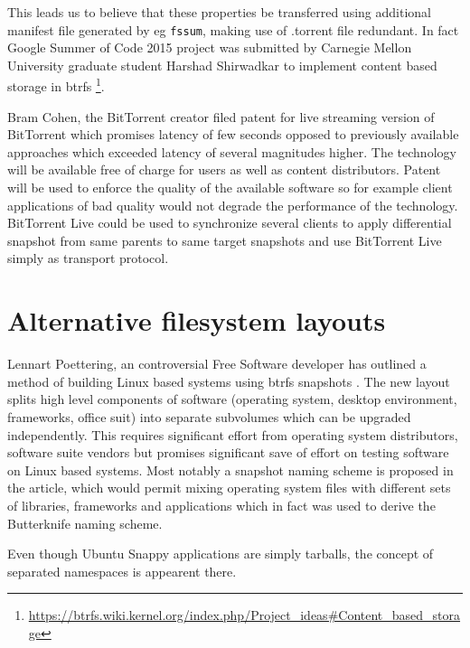 \documentclass[a4paper,11pt]{kth-mag}
\begin{document}
This leads us to believe that these properties be transferred
using additional manifest file generated by eg \lstinline!fssum!,
making use of .torrent file redundant.
In fact Google Summer of Code 2015 project
\cite{btrfs-content-storage-mode}
was submitted by
Carnegie Mellon University graduate student Harshad Shirwadkar
to implement content based storage in \acrshort{btrfs}
\footnote{\url{https://btrfs.wiki.kernel.org/index.php/Project_ideas\#Content_based_storage}}.

Bram Cohen, the BitTorrent creator filed patent for
live streaming version of BitTorrent
\cite{bittorrent-live} which promises
latency of few seconds opposed to previously available approaches
which exceeded latency of several magnitudes higher.
The technology will be available free of charge for users as well as
content distributors. Patent will be used to enforce
the quality of the available software so
for example client applications of bad quality would not
degrade the performance of the technology.
BitTorrent Live could be used to synchronize several clients
to apply differential snapshot from same parents to same target snapshots
and use BitTorrent Live simply as transport protocol.



\section{Alternative filesystem layouts}

Lennart Poettering, an controversial Free Software developer has outlined a method
of building Linux based systems using \acrshort{btrfs} snapshots
\cite{revisiting-how-we-put-together-linux-systems}.
The new layout splits high level components of software
(operating system, desktop environment, frameworks, office suit)
into separate subvolumes which can be upgraded independently.
This requires significant effort from operating system distributors,
software suite vendors but promises significant save of effort on testing
software on Linux based systems.
Most notably a snapshot naming scheme is proposed in the article,
which would permit mixing operating system files with different
sets of libraries, frameworks and applications which
in fact was used to derive the Butterknife naming scheme.

Even though Ubuntu Snappy applications are simply tarballs,
the concept of separated namespaces is appearent there.



%
%
%
%

\appendix



\twocolumn
\printglossaries
\onecolumn
\end{document}
